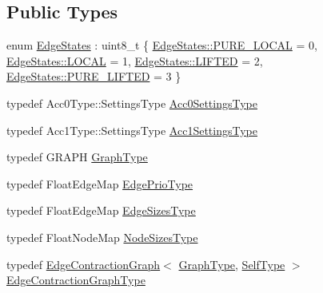 \subsection*{Public Types}
\begin{DoxyCompactItemize}
\item 
enum \hyperlink{classnifty_1_1graph_1_1agglo_1_1FixationClusterPolicy_acb3c9f163adf8275650f22017535e684}{Edge\+States} \+: uint8\+\_\+t \{ \hyperlink{classnifty_1_1graph_1_1agglo_1_1FixationClusterPolicy_acb3c9f163adf8275650f22017535e684acbb96b38a35a7553c14144f4b2fbee2b}{Edge\+States\+::\+P\+U\+R\+E\+\_\+\+L\+O\+C\+AL} = 0, 
\hyperlink{classnifty_1_1graph_1_1agglo_1_1FixationClusterPolicy_acb3c9f163adf8275650f22017535e684a54b4c4075463b2e02cd69f5cd139b5b2}{Edge\+States\+::\+L\+O\+C\+AL} = 1, 
\hyperlink{classnifty_1_1graph_1_1agglo_1_1FixationClusterPolicy_acb3c9f163adf8275650f22017535e684a289339cd2226b0a2fc2da300c1356ff8}{Edge\+States\+::\+L\+I\+F\+T\+ED} = 2, 
\hyperlink{classnifty_1_1graph_1_1agglo_1_1FixationClusterPolicy_acb3c9f163adf8275650f22017535e684aa2186482145fc52e2843b5395ba9256b}{Edge\+States\+::\+P\+U\+R\+E\+\_\+\+L\+I\+F\+T\+ED} = 3
 \}
\item 
typedef Acc0\+Type\+::\+Settings\+Type \hyperlink{classnifty_1_1graph_1_1agglo_1_1FixationClusterPolicy_a2589a9fccad644c707b88aea81318195}{Acc0\+Settings\+Type}
\item 
typedef Acc1\+Type\+::\+Settings\+Type \hyperlink{classnifty_1_1graph_1_1agglo_1_1FixationClusterPolicy_ae3cf188ccd118291fbc2b0038b59c672}{Acc1\+Settings\+Type}
\item 
typedef G\+R\+A\+PH \hyperlink{classnifty_1_1graph_1_1agglo_1_1FixationClusterPolicy_a1b20f47fae0c5f5a247ca049bb60400b}{Graph\+Type}
\item 
typedef Float\+Edge\+Map \hyperlink{classnifty_1_1graph_1_1agglo_1_1FixationClusterPolicy_a7ca35aa593d8bdbd6aa57d4bd24c7c52}{Edge\+Prio\+Type}
\item 
typedef Float\+Edge\+Map \hyperlink{classnifty_1_1graph_1_1agglo_1_1FixationClusterPolicy_a06c4c37b4f521ff00308189729d5bf79}{Edge\+Sizes\+Type}
\item 
typedef Float\+Node\+Map \hyperlink{classnifty_1_1graph_1_1agglo_1_1FixationClusterPolicy_a4599c55961921f00a208ee6d04ff8f18}{Node\+Sizes\+Type}
\item 
typedef \hyperlink{classnifty_1_1graph_1_1EdgeContractionGraph}{Edge\+Contraction\+Graph}$<$ \hyperlink{classnifty_1_1graph_1_1agglo_1_1FixationClusterPolicy_a1b20f47fae0c5f5a247ca049bb60400b}{Graph\+Type}, \hyperlink{classnifty_1_1graph_1_1agglo_1_1FixationClusterPolicy}{Self\+Type} $>$ \hyperlink{classnifty_1_1graph_1_1agglo_1_1FixationClusterPolicy_a90a9ab49f79eb7f52da75825e50a1c15}{Edge\+Contraction\+Graph\+Type}
\end{DoxyCompactItemize}
